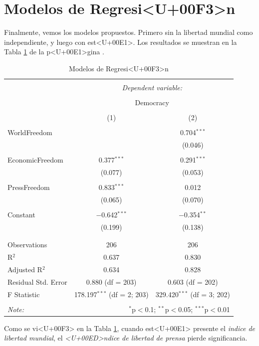 \section{Modelos de Regresi<U+00F3>n}

Finalmente, vemos los modelos propuestos. Primero sin la libertad mundial como independiente, y luego con est<U+00E1>. Los resultados se muestran en la Tabla \ref{regresiones} de la p<U+00E1>gina \pageref{regresiones}.




\begin{table}[!htbp] \centering 
  \caption{Modelos de Regresi<U+00F3>n} 
  \label{regresiones} 
\begin{tabular}{@{\extracolsep{5pt}}lcc} 
\\[-1.8ex]\hline 
\hline \\[-1.8ex] 
 & \multicolumn{2}{c}{\textit{Dependent variable:}} \\ 
\cline{2-3} 
\\[-1.8ex] & \multicolumn{2}{c}{Democracy} \\ 
\\[-1.8ex] & (1) & (2)\\ 
\hline \\[-1.8ex] 
 WorldFreedom &  & 0.704$^{***}$ \\ 
  &  & (0.046) \\ 
  & & \\ 
 EconomicFreedom & 0.377$^{***}$ & 0.291$^{***}$ \\ 
  & (0.077) & (0.053) \\ 
  & & \\ 
 PressFreedom & 0.833$^{***}$ & 0.012 \\ 
  & (0.065) & (0.070) \\ 
  & & \\ 
 Constant & $-$0.642$^{***}$ & $-$0.354$^{**}$ \\ 
  & (0.199) & (0.138) \\ 
  & & \\ 
\hline \\[-1.8ex] 
Observations & 206 & 206 \\ 
R$^{2}$ & 0.637 & 0.830 \\ 
Adjusted R$^{2}$ & 0.634 & 0.828 \\ 
Residual Std. Error & 0.880 (df = 203) & 0.603 (df = 202) \\ 
F Statistic & 178.197$^{***}$ (df = 2; 203) & 329.420$^{***}$ (df = 3; 202) \\ 
\hline 
\hline \\[-1.8ex] 
\textit{Note:}  & \multicolumn{2}{r}{$^{*}$p$<$0.1; $^{**}$p$<$0.05; $^{***}$p$<$0.01} \\ 
\end{tabular} 
\end{table} 
Como se vi<U+00F3> en la Tabla \ref{regresiones}, cuando est<U+00E1> presente el \emph{indice de libertad mundial}, el \emph{<U+00ED>ndice de libertad de prensa} pierde significancia.

